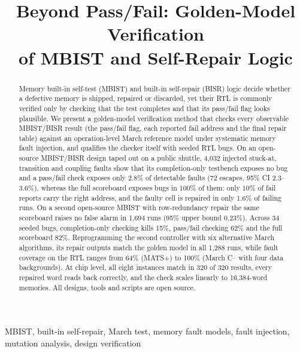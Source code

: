 \documentclass[conference]{IEEEtran}
\begin{document}
\title{Beyond Pass/Fail: Golden-Model Verification\\of MBIST and Self-Repair Logic}

\author{
}

\maketitle

\begin{abstract}
Memory built-in self-test (MBIST) and built-in self-repair (BISR) logic decide whether a
defective memory is shipped, repaired or discarded, yet their RTL is commonly verified only by
checking that the test completes and that its pass/fail flag looks plausible. We present a
golden-model verification method that checks every observable MBIST/BISR result (the pass/fail
flag, each reported fail address and the final repair table) against an operation-level March
reference model under systematic memory fault injection, and qualifies the checker itself with
seeded RTL bugs. On an open-source MBIST/BISR design taped out on a public shuttle, 4{,}032
injected stuck-at, transition and coupling faults show that its completion-only testbench
exposes no bug and a pass/fail check exposes only 2.8\% of detectable faults (72 escapes,
95\% CI 2.3--3.6\%), whereas the full scoreboard exposes bugs in 100\% of them: only 10\% of
fail reports carry the right address, and the faulty cell is repaired in only 1.6\% of failing runs.
On a second open-source MBIST with row-redundancy repair the same scoreboard raises no false
alarm in 1{,}694 runs (95\% upper bound 0.23\%). Across 34 seeded bugs, completion-only checking
kills 15\%, pass/fail checking 62\% and the full scoreboard 82\%. Reprogramming the second
controller with six alternative March algorithms, its repair outputs match the golden model in all
1{,}288 runs, while fault coverage on the RTL ranges from 64\% (MATS+) to 100\% (March C-- with four
data backgrounds). At chip level, all eight instances match in 320 of 320 results, every
repaired word reads back correctly, and the check scales linearly to 16{,}384-word memories. All designs, tools and scripts are open source.
\end{abstract}

\begin{IEEEkeywords}
MBIST, built-in self-repair, March test, memory fault models, fault injection, mutation analysis, design verification
\end{IEEEkeywords}
\end{document}
